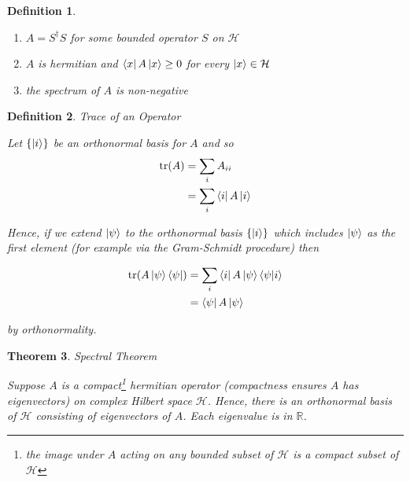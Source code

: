 \documentclass[11pt]{article}
\newcommand\0{\mathbf{0}}
\newcommand\RR{\mathbb{R}}
\newcommand\<{\langle}
\renewcommand\>{\rangle}
\newtheorem{theorem}{Theorem}[section]
\newtheorem{definition}[theorem]{Definition}
\begin{document}
\begin{appendices}
\begin{definition}
\begin{enumerate}
\item $A=S^\dag S$ for some bounded operator $S$ on $\mathcal{H}$
\item $A$ is hermitian and $\bra{x} A \ket{x} \geq 0$ for every $\ket{x} \in \mathcal{H}$
\item the spectrum of $A$ is non-negative
\end{enumerate}
\end{definition}

\begin{definition}
\label{trop}
Trace of an Operator

Let $\{\ket{i}\}$ be an orthonormal basis for $A$ and so
\begin{align*}
\tr(A) &= \sum_i A_{ii} \\
&= \sum_i \bra{i} A \ket{i}	
\end{align*}

Hence, if we extend $\ket{\psi}$ to the orthonormal basis $\{\ket{i}\}$ which includes $\ket{\psi}$ as the first element (for example via the Gram-Schmidt procedure) then

\begin{align*}
	\tr(A\ket{\psi}\bra{\psi}) &= \sum_i \bra{i} A\ket{\psi}\bra{\psi}\ket{i}	 \\
	&= \bra{\psi} A\ket{\psi}
\end{align*}

by orthonormality.
\end{definition}

\begin{theorem}Spectral Theorem
\label{thm:spec}

Suppose $A$ is a compact\footnote{the image under $A$ acting on any bounded subset of $\mathcal{H}$ is a compact subset of $\mathcal{H}$} hermitian operator (compactness ensures $A$ has eigenvectors) on complex Hilbert space $\mathcal{H}$. Hence, there is an orthonormal basis of $\mathcal{H}$ consisting of eigenvectors of $A$. Each eigenvalue is in $\RR$.	
\end{theorem}
\end{appendices}

\nocite{*}
\printbibliography
\end{document}
